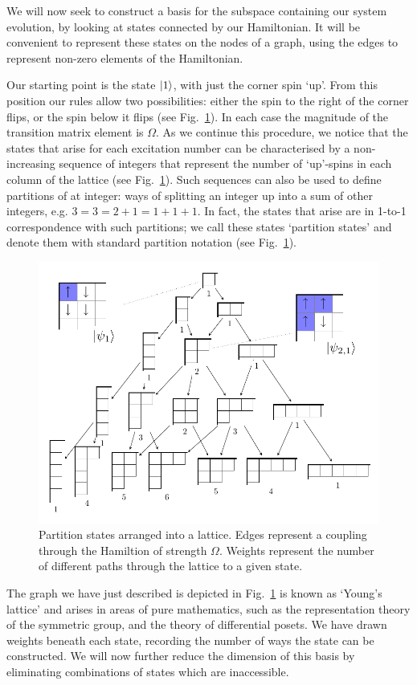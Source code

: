   We will now seek to construct a basis for the subspace containing our system evolution, by looking at states connected by our Hamiltonian. It will be convenient to represent these states on the nodes of a graph, using the edges to represent non-zero elements of the Hamiltonian.

  Our starting point is the state $\left\vert1\right\rangle$, with just the corner spin `up'. From this position our rules allow two possibilities: either the spin to the right of the corner flips, or the spin below it flips (see Fig.~\ref{partition_states}). In each case the magnitude of the transition matrix element is $\Omega$. As we continue this procedure, we notice that the states that arise for each excitation number can be characterised by a non-increasing sequence of integers that represent the number of `up'-spins in each column of the lattice (see Fig.~\ref{partition_states}). Such sequences can also be used to define partitions of at integer: ways of splitting an integer up into a sum of other integers, e.g. $3=3=2+1=1+1+1$. In fact, the states that arise are in 1-to-1 correspondence with such partitions; we call these states `partition states' and denote them with standard partition notation (see Fig.~\ref{partition_states}).
  \begin{figure}
  \begin{center}
    
  \includegraphics[scale=0.6]{assets/youngs_lattice_with_spins}
\end{center}
  \caption{Partition states arranged into a lattice. Edges represent a coupling
    through the Hamiltion of strength $\Omega$. Weights represent the
      number of different paths through the lattice to a given state.}
      \label{partition_states}
      \end{figure}
      The graph we have just described is depicted in Fig.~\ref{partition_states}  is known as `Young's lattice' and arises in areas of pure mathematics, such as the representation theory of the symmetric group, and the theory of differential posets. We have drawn weights beneath each state, recording the number of ways the state can be constructed. We will now further reduce the dimension of this basis
      by eliminating combinations of states which are inaccessible.

